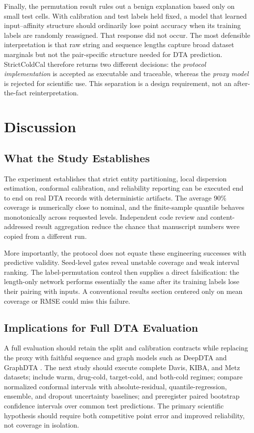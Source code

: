 \documentclass[lettersize,journal]{IEEEtran}
\begin{document}
Finally, the permutation result rules out a benign explanation based only on small test cells. With calibration and test labels held fixed, a model that learned input--affinity structure should ordinarily lose point accuracy when its training labels are randomly reassigned. That response did not occur. The most defensible interpretation is that raw string and sequence lengths capture broad dataset marginals but not the pair-specific structure needed for DTA prediction. StrictColdCal therefore returns two different decisions: the \emph{protocol implementation} is accepted as executable and traceable, whereas the \emph{proxy model} is rejected for scientific use. This separation is a design requirement, not an after-the-fact reinterpretation.

\section{Discussion}

\subsection{What the Study Establishes}
The experiment establishes that strict entity partitioning, local dispersion estimation, conformal calibration, and reliability reporting can be executed end to end on real DTA records with deterministic artifacts. The average 90\% coverage is numerically close to nominal, and the finite-sample quantile behaves monotonically across requested levels. Independent code review and content-addressed result aggregation reduce the chance that manuscript numbers were copied from a different run.

More importantly, the protocol does not equate these engineering successes with predictive validity. Seed-level gates reveal unstable coverage and weak interval ranking. The label-permutation control then supplies a direct falsification: the length-only network performs essentially the same after its training labels lose their pairing with inputs. A conventional results section centered only on mean coverage or RMSE could miss this failure.

\subsection{Implications for Full DTA Evaluation}
A full evaluation should retain the split and calibration contracts while replacing the proxy with faithful sequence and graph models such as DeepDTA \cite{deepdta} and GraphDTA \cite{graphdta}. The next study should execute complete Davis, KIBA, and Metz datasets; include warm, drug-cold, target-cold, and both-cold regimes; compare normalized conformal intervals with absolute-residual, quantile-regression, ensemble, and dropout uncertainty baselines; and preregister paired bootstrap confidence intervals over common test predictions. The primary scientific hypothesis should require both competitive point error and improved reliability, not coverage in isolation.
\end{document}
